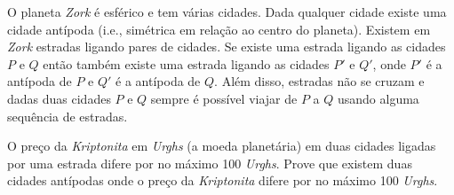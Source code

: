 O planeta \textit{Zork} é esférico e tem várias cidades. Dada qualquer cidade existe uma cidade antípoda (i.e., simétrica em relação ao centro do planeta).
Existem em \textit{Zork} estradas ligando pares de cidades. Se existe uma estrada ligando as cidades $P$ e $Q$ então também existe uma estrada ligando as cidades $P'$ e $Q'$, onde $P'$ é a antípoda de $P$ e $Q'$ é a antípoda de $Q$.
Além disso, estradas não se cruzam e dadas duas cidades $P$ e $Q$ sempre é possível viajar de $P$ a $Q$ usando alguma sequência de estradas.

O preço da \textit{Kriptonita} em \textit{Urghs} (a moeda planetária) em duas cidades ligadas por uma estrada difere por no máximo 100 \textit{Urghs}.
Prove que existem duas cidades antípodas onde o preço da \textit{Kriptonita} difere por no máximo 100 \textit{Urghs}.